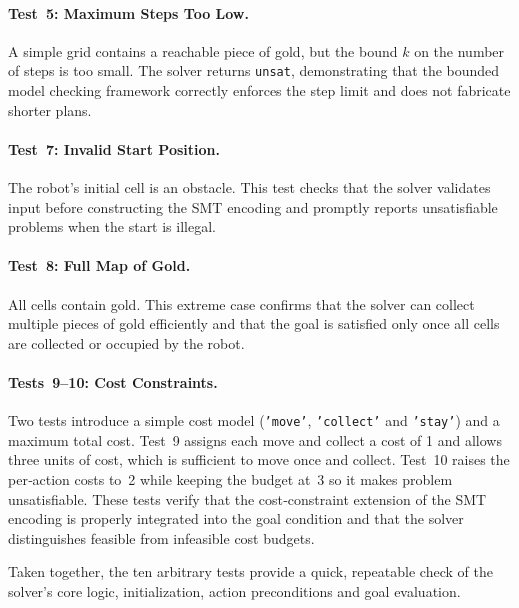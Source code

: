\documentclass[12pt, a4paper, oneside]{report} %
\begin{document}
\paragraph{Test 5: Maximum Steps Too Low.}
A simple grid contains a reachable piece of gold, but the bound $k$ on the number of steps is too small. The solver returns \texttt{unsat}, demonstrating that the bounded model checking framework correctly enforces the step limit and does not fabricate shorter plans.
\paragraph{Test 7: Invalid Start Position.}
The robot’s initial cell is an obstacle. This test checks that the solver validates input before constructing the SMT encoding and promptly reports unsatisfiable problems when the start is illegal.
\paragraph{Test 8: Full Map of Gold.}
All cells contain gold.  This extreme case confirms that the solver can collect multiple pieces of gold efficiently and that the goal is satisfied only once all cells are collected or occupied by the robot.
\paragraph{Tests 9–10: Cost Constraints.}
Two tests introduce a simple cost model (\texttt{'move'}, \texttt{'collect'} and \texttt{'stay'}) and a maximum total cost. Test 9 assigns each move and collect a cost of 1 and allows three units of cost, which is sufficient to move once and collect. Test 10 raises the per‑action costs to 2 while keeping the budget at 3 so it makes problem unsatisfiable. These tests verify that the cost‑constraint extension of the SMT encoding is properly integrated into the goal condition and that the solver distinguishes feasible from infeasible cost budgets.

Taken together, the ten arbitrary tests provide a quick, repeatable check of the solver’s core logic, initialization, action preconditions and goal evaluation.
\end{document}
